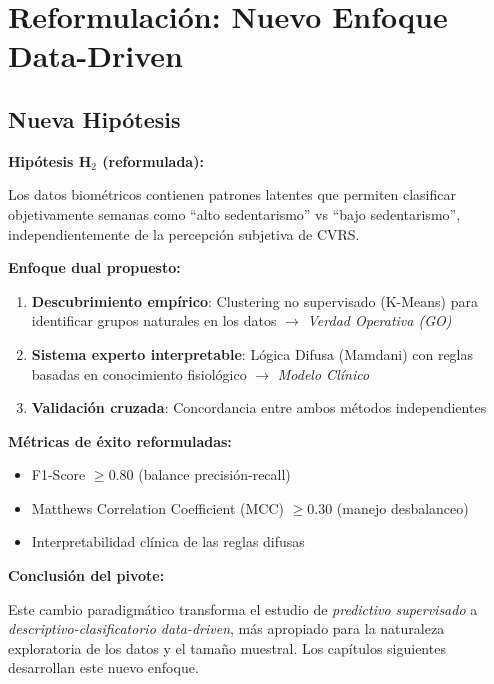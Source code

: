 \documentclass[12pt,letterpaper,twoside]{report}
\begin{document}
\section{Reformulación: Nuevo Enfoque Data-Driven}

\subsection{Nueva Hipótesis}

\begin{hipotesisbox}
\textbf{Hipótesis H$_2$ (reformulada):}

Los datos biométricos contienen patrones latentes que permiten clasificar objetivamente semanas como ``alto sedentarismo'' vs ``bajo sedentarismo'', independientemente de la percepción subjetiva de CVRS.

\textbf{Enfoque dual propuesto:}
\begin{enumerate}[noitemsep]
    \item \textbf{Descubrimiento empírico}: Clustering no supervisado (K-Means) para identificar grupos naturales en los datos $\to$ \textit{Verdad Operativa (GO)}
    \item \textbf{Sistema experto interpretable}: Lógica Difusa (Mamdani) con reglas basadas en conocimiento fisiológico $\to$ \textit{Modelo Clínico}
    \item \textbf{Validación cruzada}: Concordancia entre ambos métodos independientes
\end{enumerate}
\end{hipotesisbox}

\begin{estadisticobox}
\textbf{Métricas de éxito reformuladas:}

\begin{itemize}[noitemsep]
    \item F1-Score $\geq 0.80$ (balance precisión-recall)
    \item Matthews Correlation Coefficient (MCC) $\geq 0.30$ (manejo desbalanceo)
    \item Interpretabilidad clínica de las reglas difusas
\end{itemize}
\end{estadisticobox}

\begin{conclusionbox}
\textbf{Conclusión del pivote:}

Este cambio paradigmático transforma el estudio de \textit{predictivo supervisado} a \textit{descriptivo-clasificatorio data-driven}, más apropiado para la naturaleza exploratoria de los datos y el tamaño muestral. Los capítulos siguientes desarrollan este nuevo enfoque.
\end{conclusionbox}
\end{document}

